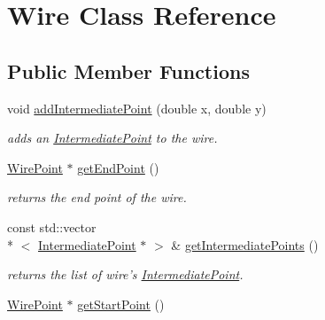 \hypertarget{class_open_chams_1_1_wire}{\section{Wire Class Reference}
\label{class_open_chams_1_1_wire}
}
\subsection*{Public Member Functions}
\begin{DoxyCompactItemize}
\item 
void \hyperlink{class_open_chams_1_1_wire_aab66049b1f5ccf8de85249720152833a}{add\-Intermediate\-Point} (double x, double y)
\begin{DoxyCompactList}\small\item\em adds an \hyperlink{class_open_chams_1_1_intermediate_point}{Intermediate\-Point} to the wire. \end{DoxyCompactList}\item 
\hypertarget{class_open_chams_1_1_wire_ab1c91025a4117cede119f53d9eb8093b}{\hyperlink{class_open_chams_1_1_wire_point}{Wire\-Point} $\ast$ \hyperlink{class_open_chams_1_1_wire_ab1c91025a4117cede119f53d9eb8093b}{get\-End\-Point} ()}\label{class_open_chams_1_1_wire_ab1c91025a4117cede119f53d9eb8093b}

\begin{DoxyCompactList}\small\item\em returns the end point of the wire. \end{DoxyCompactList}\item 
\hypertarget{class_open_chams_1_1_wire_aac2840e22e03db0ff2c0fe0f83c56fdd}{const std\-::vector\\*
$<$ \hyperlink{class_open_chams_1_1_intermediate_point}{Intermediate\-Point} $\ast$ $>$ \& \hyperlink{class_open_chams_1_1_wire_aac2840e22e03db0ff2c0fe0f83c56fdd}{get\-Intermediate\-Points} ()}\label{class_open_chams_1_1_wire_aac2840e22e03db0ff2c0fe0f83c56fdd}

\begin{DoxyCompactList}\small\item\em returns the list of wire's \hyperlink{class_open_chams_1_1_intermediate_point}{Intermediate\-Point}. \end{DoxyCompactList}\item 
\hypertarget{class_open_chams_1_1_wire_ad68ddfcb6d4cbbe3c06d03fb4350dcdb}{\hyperlink{class_open_chams_1_1_wire_point}{Wire\-Point} $\ast$ \hyperlink{class_open_chams_1_1_wire_ad68ddfcb6d4cbbe3c06d03fb4350dcdb}{get\-Start\-Point} ()}\label{class_open_chams_1_1_wire_ad68ddfcb6d4cbbe3c06d03fb4350dcdb}


\end{DoxyCompactItemize}
